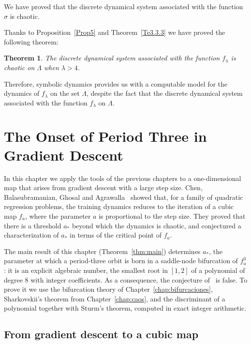 \documentclass[12pt,a4paper]{report}
\newtheorem{teorema}{Theorem}[section]
\theoremstyle{definition}
\begin{document}
We have proved that the discrete dynamical system associated with the function $\sigma$ is chaotic.

Thanks to Proposition~\ref{Prop5} and Theorem~\ref{Te3.3.3} we have proved the following theorem:

\begin{teorema}
The discrete dynamical system associated with the function $f_{\lambda}$ is chaotic on $\Lambda$ when $\lambda > 4$.
\end{teorema}

Therefore, symbolic dynamics provides us with a computable model for the dynamics of $f_{\lambda}$ on the set $\Lambda$, despite the fact that the discrete dynamical system associated with the function $f_{\lambda}$ on $\Lambda$.






\chapter{The Onset of Period Three in Gradient Descent}\label{chap:gd}

In this chapter we apply the tools of the previous chapters to a one-dimensional map that arises from gradient descent with a large step size. Chen, Balasubramanian, Ghosal and Agrawalla~\cite{chen2024} showed that, for a family of quadratic regression problems, the training dynamics reduces to the iteration of a cubic map $f_a$, where the parameter $a$ is proportional to the step size. They proved that there is a threshold $a_*$ beyond which the dynamics is chaotic, and conjectured a characterization of $a_*$ in terms of the critical point of $f_a$.

The main result of this chapter (Theorem~\ref{thm:main}) determines $a_*$, the parameter at which a period-three orbit is born in a saddle-node bifurcation of $f_a^3$: it is an explicit algebraic number, the smallest root in $[1,2]$ of a polynomial of degree $8$ with integer coefficients. As a consequence, the conjecture of~\cite{chen2024} is false. To prove it we use the bifurcation theory of Chapter~\ref{chap:bifurcaciones}, Sharkovskii's theorem from Chapter~\ref{chap:caos}, and the discriminant of a polynomial together with Sturm's theorem, computed in exact integer arithmetic.

\section{From gradient descent to a cubic map}
\end{document}
